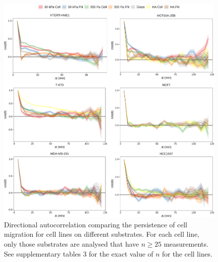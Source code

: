 \documentclass[11pt,letterpaper,english,oneside]{article} %
\begin{document}
\begin{figure}[H]
    \hspace*{-0.8cm}
    \centering
    \includegraphics{../Figures/Supplementary_Figures17_21/supplementary_figure20.png}
    \caption{Directional autocorrelation comparing the persistence of cell migration for cell lines on different substrates.
    For each cell line, only those substrates are analysed that have $n \geq 25$ measurements.
    See supplementary tables 3 for the exact value of $n$ for the cell lines.}
    \label{fig:fig20}
\end{figure}
\end{document}
